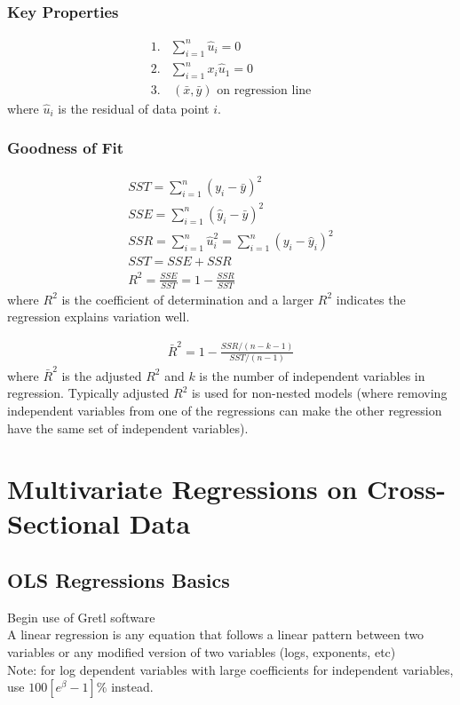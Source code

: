 \documentclass[12pt]{article}
\numberwithin{equation}{section}
\begin{document}
\subsubsection{Key Properties}
\label{sec:key_properties}
\begin{align}
    1.& \sum_{i=1}^{n} \hat{u}_i = 0 \\
    2.& \sum_{i=1}^{n} x_i \hat{u}_1 = 0 \\
    3.&\, (\bar{x},\bar{y}) \text{ on regression line}
\end{align}
where $\hat{u}_i$ is the residual of data point $i$.

\subsubsection{Goodness of Fit}
\label{sec:goodness_of_fit}
\begin{gather}
    SST = \sum_{i=1}^{n} (y_i-\bar{y})^2 \\
    SSE = \sum_{i=1}^{n} (\hat{y}_i-\bar{y})^2 \\
    SSR = \sum_{i=1}^{n} \hat{u}_i^2 = \sum_{i=1}^{n} (y_i-\hat{y}_i)^2 \\
    SST = SSE + SSR \\
    R^2 = \frac{SSE}{SST} = 1 - \frac{SSR}{SST}
\end{gather}
where $R^2$ is the coefficient of determination and a larger $R^2$ indicates the regression explains variation well.

\begin{gather}
    \bar{R}^2 = 1 - \frac{SSR/(n-k-1)}{SST/(n-1)}
\end{gather}
where $\bar{R}^2$ is the adjusted $R^2$ and $k$ is the number of independent variables in regression. Typically adjusted $R^2$ is used for non-nested models (where removing independent variables from one of the regressions can make the other regression have the same set of independent variables).

\section{Multivariate Regressions on Cross-Sectional Data}

\subsection{OLS Regressions Basics}
Begin use of Gretl software \\[0.5cm]
A linear regression is any equation that follows a linear pattern between two variables or any modified version of two variables (logs, exponents, etc) \\[0.5cm]
Note: for log dependent variables with large coefficients for independent variables, use $100 [e^{\beta}-1]\%$ instead.
\end{document}
